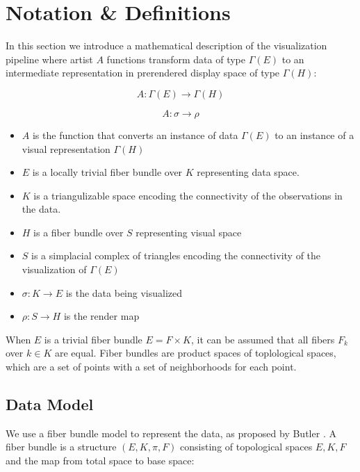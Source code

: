 \documentclass[../main.tex]{subfiles}
\begin{document}
\section{Notation \& Definitions}
In this section we introduce a mathematical description of the visualization pipeline where artist $A$ functions transform data of type $\Gamma(E)$ to an intermediate representation in prerendered display space of type $\Gamma(H)$:

\begin{equation}
    A: \Gamma(E) \rightarrow \Gamma(H)
    \label{eq:artist}
\end{equation}

\begin{equation}
    A: \sigma \rightarrow \rho
\end{equation}

\begin{itemize}
\item $A$ is the function that converts an instance of data $\Gamma(E)$ to an instance of a visual representation $\Gamma(H)$ 
\item $E$ is a locally trivial fiber bundle over $K$ representing data space.
\item $K$ is a triangulizable space encoding the connectivity of the observations in the data. 
\item $H$ is a fiber bundle over $S$ representing visual space
\item $S$ is a simplacial complex of triangles encoding the connectivity of the visualization of $\Gamma(E)$
\item $\sigma: K\rightarrow E$ is the data being visualized
\item $\rho: S \rightarrow H$ is the render map
\end{itemize}

When $E$ is a trivial fiber bundle $E = F \times K$, it can be assumed that all fibers $F_{k}$ over $k \in K$ are equal. Fiber bundles are product spaces of toplological spaces, which are a set of points with a set of neighborhoods for each point\cite{FiberBundle2020, rowlandFiberBundle}.

\subsection{Data Model}

We use a fiber bundle model to represent the data, as proposed by Butler 
\cite{butlerVectorBundleClassesForm1992,butlerVisualizationModelBased1989}. A fiber bundle is a structure $(E, K, \pi, F)$  consisting of topological spaces $E, K, F$ and the map from total space to base space:
\end{document}
